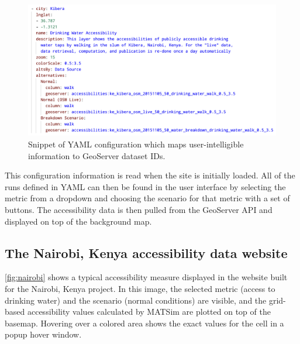 \begin{figure}[!ht]
  \includegraphics[width=\textwidth]{chapters/12-server-experiments/images/geoserver-yaml.png}
  \caption[GeoServer YAML configuration example]{Snippet of YAML configuration which maps user-intelligible information to GeoServer dataset IDs.}
  \label{fig:geoserver-yaml}
\end{figure}

This configuration information is read when the site is initially loaded. All of the runs defined in YAML can then be found in the user interface by selecting the metric from a dropdown and choosing the scenario for that metric with a set of buttons. The accessibility data is then pulled from the GeoServer API and displayed on top of the background map.

\hypertarget{server-experiments-geoserver-3}{%
\subsection{The Nairobi, Kenya accessibility data website}
\label{server-experiments-geoserver-3}}

\autoref{fig:nairobi} shows a typical accessibility measure displayed in the website built for the Nairobi, Kenya project. In this image, the selected metric (access to drinking water) and the scenario (normal conditions) are visible, and the grid-based accessibility values calculated by MATSim are plotted on top of the basemap. Hovering over a colored area shows the exact values for the cell in a popup hover window.

